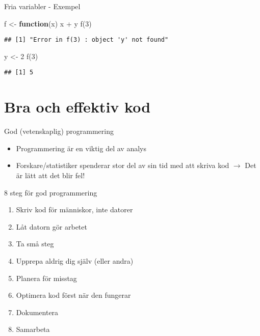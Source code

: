 \documentclass[
  11pt,
  ignorenonframetext,
]{beamer}
\newenvironment{Shaded}{\begin{snugshade}}{\end{snugshade}}
\newcommand{\ControlFlowTok}[1]{\textcolor[rgb]{0.13,0.29,0.53}{\textbf{#1}}}
\newcommand{\DecValTok}[1]{\textcolor[rgb]{0.00,0.00,0.81}{#1}}
\newcommand{\FunctionTok}[1]{\textcolor[rgb]{0.00,0.00,0.00}{#1}}
\newcommand{\NormalTok}[1]{#1}
\newcommand{\OtherTok}[1]{\textcolor[rgb]{0.56,0.35,0.01}{#1}}
\newcommand{\SpecialCharTok}[1]{\textcolor[rgb]{0.00,0.00,0.00}{#1}}
\providecommand{\tightlist}{%
  \setlength{\itemsep}{0pt}\setlength{\parskip}{0pt}}
\begin{document}
\begin{frame}[fragile]{Fria variabler - Exempel}
\protect\hypertarget{fria-variabler---exempel}{}
\begin{Shaded}
\begin{Highlighting}[]
\NormalTok{f }\OtherTok{\textless{}{-}} \ControlFlowTok{function}\NormalTok{(x) x }\SpecialCharTok{+}\NormalTok{ y}
\FunctionTok{f}\NormalTok{(}\DecValTok{3}\NormalTok{)}
\end{Highlighting}
\end{Shaded}

\begin{verbatim}
## [1] "Error in f(3) : object 'y' not found"
\end{verbatim}

\begin{Shaded}
\begin{Highlighting}[]
\NormalTok{y }\OtherTok{\textless{}{-}} \DecValTok{2}
\FunctionTok{f}\NormalTok{(}\DecValTok{3}\NormalTok{)}
\end{Highlighting}
\end{Shaded}

\begin{verbatim}
## [1] 5
\end{verbatim}
\end{frame}

\hypertarget{bra-och-effektiv-kod}{%
\section{Bra och effektiv kod}\label{bra-och-effektiv-kod}}

\begin{frame}{God (vetenskaplig) programmering}
\protect\hypertarget{god-vetenskaplig-programmering}{}
\begin{itemize}
\tightlist
\item
  Programmering är en viktig del av analys
\item
  Forskare/statistiker spenderar stor del av sin tid med att skriva kod
  $\rightarrow$ Det är lätt att det blir fel!
\end{itemize}
\end{frame}

\begin{frame}{8 steg för god programmering}
\protect\hypertarget{steg-fuxf6r-god-programmering}{}
\begin{enumerate}
\tightlist
\item
  Skriv kod för människor, inte datorer
\item
  Låt datorn gör arbetet
\item
  Ta små steg
\item
  Upprepa aldrig dig själv (eller andra)
\item
  Planera för misstag
\item
  Optimera kod först när den fungerar
\item
  Dokumentera
\item
  Samarbeta
\end{enumerate}
\end{frame}
\end{document}
